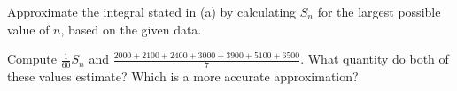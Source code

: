\begin{exercises}
		\item Approximate the integral stated in (a) by calculating $S_n$ for the largest possible value of $n$, based on the given data.
		
		\item Compute $\frac{1}{60} S_n$ and $\frac{2000+2100+2400+3000+3900+5100+6500}{7}$.  What quantity do both of these values estimate?  Which is a more accurate approximation?
	\ea
\end{exercises}
\afterexercises
